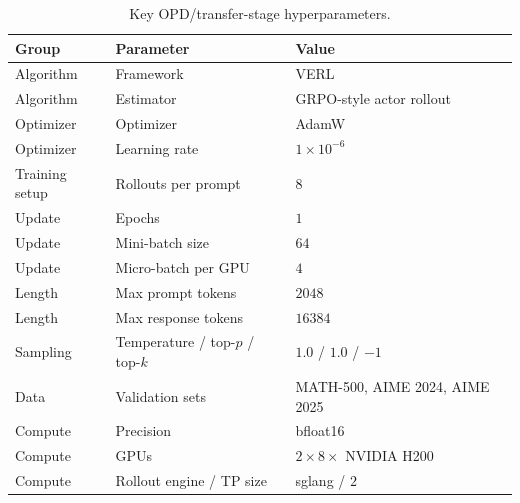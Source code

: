 \documentclass{article}
\begin{document}
\begin{table}[!ht]
\caption{Key OPD/transfer-stage hyperparameters.}
\label{tab:opd-hyperparameters}
\centering
\begingroup
\setlength{\tabcolsep}{5pt}
\footnotesize
\begin{tabular}{@{}lll@{}}
\toprule
Group & Parameter & Value \\
\midrule
Algorithm & Framework & VERL \\
Algorithm & Estimator & GRPO-style actor rollout \\
Optimizer & Optimizer & AdamW \\
Optimizer & Learning rate & $1\times10^{-6}$ \\
Training setup & Rollouts per prompt & $8$ \\
Update & Epochs & $1$ \\
Update & Mini-batch size & $64$ \\
Update & Micro-batch per GPU & $4$ \\
Length & Max prompt tokens & $2048$ \\
Length & Max response tokens & $16384$ \\
Sampling & Temperature / top-$p$ / top-$k$ & $1.0$ / $1.0$ / $-1$ \\
Data & Validation sets & MATH-500, AIME 2024, AIME 2025 \\
Compute & Precision & bfloat16 \\
Compute & GPUs & $2\times 8 \times$ NVIDIA H200 \\
Compute & Rollout engine / TP size & sglang / $2$ \\
\bottomrule
\end{tabular}
\endgroup
\end{table}
\end{document}
